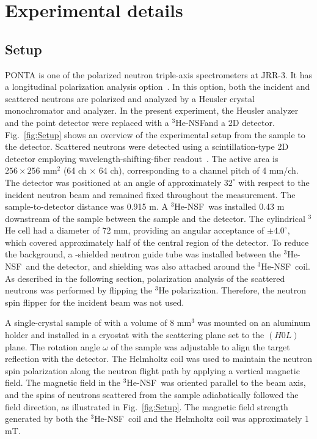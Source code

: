 \documentclass[%
 reprint,
superscriptaddress,
 amsmath,amssymb,
 aps,
floatfix,
]{revtex4-2}
\newcommand{\He}{$^3$He }
\newcommand{\Hensf}{$^3$He-NSF}
\begin{document}
\section{Experimental details}


\subsection{Setup}
PONTA is one of the polarized neutron triple-axis spectrometers at JRR-3.
It has a longitudinal polarization analysis option~\cite{nakajima_polarized_2024}.
In this option, both the incident and scattered neutrons are polarized and analyzed by a  Heusler crystal monochromator and analyzer.
In the present experiment, the Heusler analyzer and the point detector were replaced with a \Hensf and a 2D detector.
Fig.~\ref{fig:Setup} shows an overview of the experimental setup from the sample to the detector.
Scattered neutrons were detected using a scintillation-type 2D detector employing wavelength-shifting-fiber readout~\cite{nakamura_large-area_2012}.
The active area is \(256 \times 256\) mm$^2$ (64 ch $\times$ 64 ch), corresponding to a channel pitch of 4 mm/ch.
The detector was positioned at an angle of approximately \(32^\circ\) with respect to the incident neutron beam and remained fixed throughout the measurement.
The sample-to-detector distance was 0.915 m.
A \Hensf~was installed 0.43 m downstream of the sample between the sample and the detector.
The cylindrical \He cell had a diameter of 72 mm, providing an angular acceptance of \(\pm4.0^\circ\), which covered approximately half of the central region of the detector.
To reduce the background, a -shielded neutron guide tube was installed between the \Hensf~and the detector, and  shielding was also attached around the \Hensf~coil.
As described in the following section, polarization analysis of the scattered neutrons was performed by flipping the \He polarization.
Therefore, the neutron spin flipper for the incident beam was not used.

A single-crystal sample of  with a volume of 8 mm$^3$ was mounted on an aluminum holder and installed in a cryostat with the scattering plane set to the $(H0L)$ plane.
The rotation angle $\omega$ of the sample was adjustable to align the target reflection with the detector.
The Helmholtz coil was used to maintain the neutron spin polarization along the neutron flight path by applying a vertical magnetic field.
The magnetic field in the \Hensf~was oriented parallel to the beam axis, and the spins of neutrons scattered from the sample adiabatically followed the field direction, as illustrated in Fig.~\ref{fig:Setup}.
The magnetic field strength generated by both the \Hensf~coil and the Helmholtz coil was approximately 1 mT.
\end{document}
